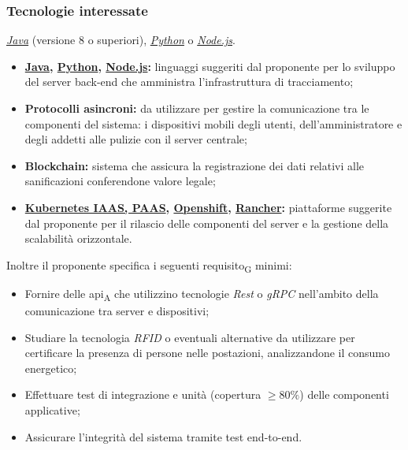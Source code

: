 \subsubsection{Tecnologie interessate}

\textit{\href{https://www.java.com/it/about/}{Java}} (versione 8 o superiori), \textit{\href{https://www.python.org/about/}{Python}} o \textit{\href{https://nodejs.org/it/about/}{Node.js}}.
\begin{itemize}
	\item{\textbf{\href{https://www.java.com/it/about/}{Java}, \href{https://www.python.org/about/}{Python}, \href{https://nodejs.org/it/about/}{Node.js}:}} linguaggi suggeriti dal proponente per lo sviluppo del server back-end che amministra l'infrastruttura di tracciamento;
	\item{\textbf{Protocolli asincroni:}} da utilizzare per gestire la comunicazione tra le componenti del sistema: i dispositivi mobili degli utenti, dell'amministratore e degli addetti alle pulizie con il server centrale;
	\item{\textbf{Blockchain:}} sistema che assicura la registrazione dei dati relativi alle sanificazioni conferendone valore legale;  
	\item{\textbf{\href{https://kubernetes.io/it/docs/concepts/overview/what-is-kubernetes/}{Kubernetes IAAS, PAAS}, \href{https://www.openshift.com/learn/what-is-openshift}{Openshift}, \href{https://rancher.com/about/}{Rancher}:}} piattaforme suggerite dal proponente per il rilascio delle componenti del server e la gestione della scalabilità orizzontale.
\end{itemize}

Inoltre il proponente specifica i seguenti requisito\textsubscript{G} minimi:
\begin{itemize}
	\item Fornire delle api\textsubscript{A} che utilizzino tecnologie \textit{Rest} o \textit{gRPC} nell'ambito della comunicazione tra server e dispositivi;
	\item Studiare la tecnologia \textit{RFID} o eventuali alternative da utilizzare per certificare la presenza di persone nelle postazioni, analizzandone il consumo energetico;
	\item Effettuare test di integrazione e unità (copertura $\geq 80\%$) delle componenti applicative;
	\item Assicurare l'integrità del sistema tramite test end-to-end.
\end{itemize}
	
